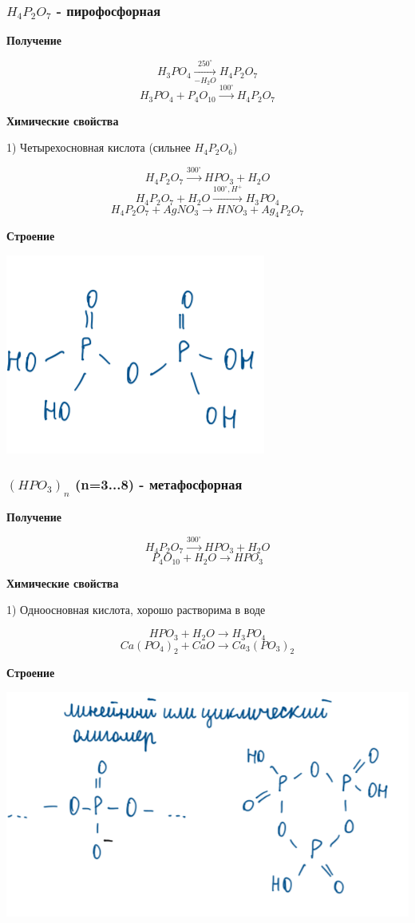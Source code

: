 \documentclass[14pt,a4paper]{scrartcl}
\begin{document}
\subsubsection{$H_4P_2O_7$ - пирофосфорная}

\textbf{Получение}

$$H_3PO_4 \xrightarrow[-H_2O]{250^{\circ}} H_4P_2O_7$$
$$H_3PO_4 + P_4O_{10} \xrightarrow{100^{\circ}} H_4P_2O_7$$

\textbf{Химические свойства}

1) Четырехосновная кислота (сильнее $H_4P_2O_6$)

$$H_4P_2O_7 \xrightarrow{300^{\circ}} HPO_3 + H_2O$$
$$H_4P_2O_7 + H_2O \xrightarrow{100^{\circ}, H^+} H_3PO_4$$
$$H_4P_2O_7 + AgNO_3 \rightarrow HNO_3 + Ag_4P_2O_7$$

\textbf{Строение}

\includegraphics{9v12.png}

\subsubsection{$(HPO_3)_n$ (n=3...8) - метафосфорная}

\textbf{Получение}

$$H_4P_2O_7 \xrightarrow{300^{\circ}} HPO_3 + H_2O$$
$$P_4O_10 + H_2O \rightarrow HPO_3$$

\textbf{Химические свойства}

1) Одноосновная кислота, хорошо растворима в воде

$$HPO_3 + H_2O \rightarrow H_3PO_4$$
$$Ca(PO_4)_2 + CaO \rightarrow Ca_3(PO_3)_2$$

\textbf{Строение}

\includegraphics{9v13.png}
\end{document}

